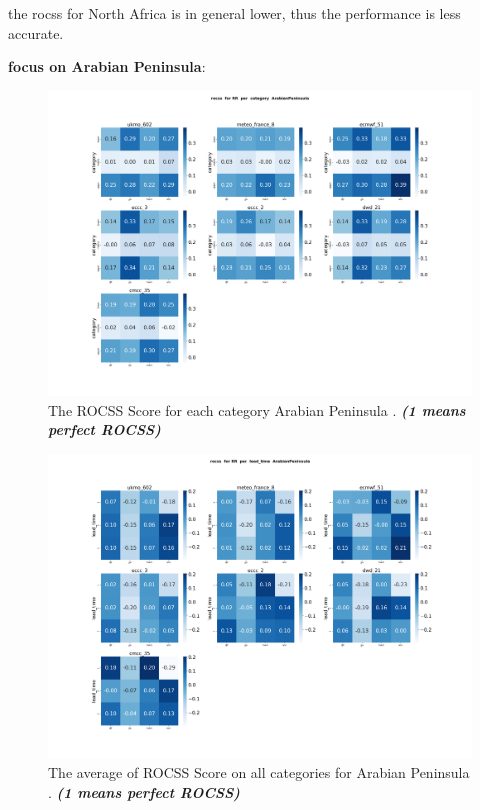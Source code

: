 the rocss for North Africa is in general lower, thus the performance is less accurate.

\vspace{1.5cm}
\textbf{focus on Arabian Peninsula}:

\begin{figure}[H]
    \centering
    \includegraphics[scale=0.25]{plots/prob/rocss/rocss_RR_category_ArabianPeninsula.png}
    \caption{The ROCSS Score for each category Arabian Peninsula . \textbf{\textit{(1 means perfect ROCSS)}}}
\end{figure}


\begin{figure}[H]
    \centering
    \includegraphics[scale=0.25]{plots/prob/rocss/rocss_RR_lead_time_ArabianPeninsula.png}
    \caption{The average of  ROCSS Score on all categories for Arabian Peninsula . \textbf{\textit{(1 means perfect ROCSS)}}}
\end{figure}


